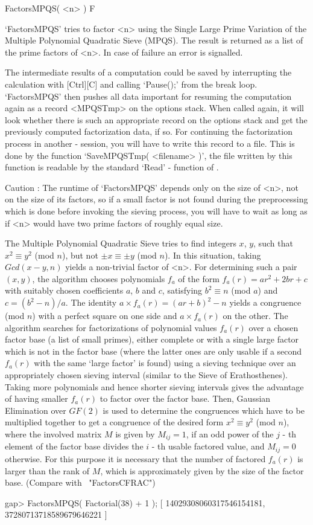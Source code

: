 \>FactorsMPQS( <n> ) F

`FactorsMPQS' tries to factor <n> using the Single Large Prime
Variation of the Multiple Polynomial Quadratic Sieve (MPQS).
The result is returned as a list of the prime factors of <n>.
In case of failure an error is signalled.

The intermediate results of a computation could be saved by
interrupting the calculation with [Ctrl][C] and calling `Pause();'
from the break loop. `FactorsMPQS' then pushes all data important
for resuming the computation again as a record <MPQSTmp>
on the options stack. When called again, it will look whether
there is such an appropriate record on the options stack
and get the previously computed factorization data, if so. 
For continuing the factorization process in another 
{\GAP} - session, you will have to write this record to a file.
This is done by the function `SaveMPQSTmp( <filename> )',
the file written by this function is readable by the 
standard `Read' - function of {\GAP}.

Caution : The runtime of `FactorsMPQS' depends only on the size of <n>, 
not on the size of its factors, so if a small factor is not found during
the preprocessing which is done before invoking the sieving process,
you will have to wait as long as if <n> would have two prime factors
of roughly equal size.

The Multiple Polynomial Quadratic Sieve
tries to find integers $x$, $y$, such that $x^2 \equiv y^2$ (mod $n$),
but not $\pm x \equiv \pm y$ (mod $n$). In this situation,
taking $Gcd(x - y,n)$ yields a non-trivial factor of <n>.
For determining such a pair $(x,y)$, the algorithm chooses polynomials
$f_a$ of the form $f_a(r) = ar^2 + 2br + c$ with suitably chosen
coefficients $a$, $b$ and $c$, satisfying $b^2 \equiv n$ (mod $a$)
and $c = (b^2 - n)/a$.
The identity $a \times f_a(r) = (ar + b)^2 - n$ yields a congruence
(mod $n$) with a perfect square on one side and $a \times f_a(r)$ on
the other. The algorithm searches for factorizations of polynomial values 
$f_a(r)$ over a chosen factor base (a list of small primes),
either complete or with a single large factor which is not in the
factor base (where the latter ones are only usable if a second $f_a(r)$
with the same \lq large factor' is found) using a sieving technique over
an appropriately chosen sieving interval 
(similar to the Sieve of Erathosthenes).
Taking more polynomials and hence shorter sieving intervals gives
the advantage of having smaller $f_a(r)$ to factor over the factor base.
Then, Gaussian Elimination over $GF(2)$ is used to determine the
congruences which have to be multiplied together to get a congruence
of the desired form $x^2 \equiv y^2$ (mod $n$), where the involved 
matrix $M$ is given by $M_{ij} = 1$, if an odd power of the $j$ - th 
element of the factor base divides the $i$ - th usable factored
value, and $M_{ij} = 0$ otherwise.
For this purpose it is necessary that the number of factored 
$f_a(r)$ is larger than the rank of $M$, which is approximately
given by the size of the factor base.
(Compare with ~"FactorsCFRAC")

\beginexample
gap> FactorsMPQS( Factorial(38) + 1 );
[ 14029308060317546154181, 37280713718589679646221 ]
\endexample

